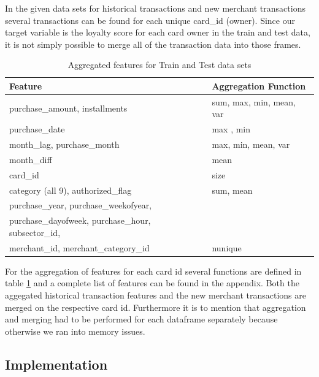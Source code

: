 \documentclass{article}
\begin{document}
In the given data sets for historical transactions and new merchant transactions several transactions can be found for each unique card\_id (owner). Since our target variable is the loyalty score for each card owner in the train and test data, it is not simply possible to merge all of the transaction data into those frames.

\newpage

\begin{table}[h]
 \caption{Aggregated features for Train and Test data sets}
  \centering
  \begin{tabular}{ll}
    \toprule
    Feature & Aggregation Function\\
    \midrule
    purchase\_amount, installments & sum, max, min, mean, var\\
    purchase\_date & max , min\\
    month\_lag, purchase\_month & max, min, mean, var\\
    month\_diff & mean\\
    card\_id & size\\
    category (all 9), authorized\_flag & sum, mean\\
    purchase\_year, purchase\_weekofyear, \\
    purchase\_dayofweek,  purchase\_hour,  subsector\_id,\\
    merchant\_id, merchant\_category\_id & nunique \\
    \bottomrule
  \end{tabular}
  \label{tab:table_agg}
\end{table}

For the aggregation of features for each card id several functions are defined in table \ref{tab:table_agg} and a complete list of features can be found in the appendix. Both the aggegated historical transaction features and the new merchant transactions are merged on the respective card id. Furthermore it is to mention that aggregation and merging had to be performed for each dataframe separately because otherwise we ran into memory issues.


\subsection{Implementation}
\end{document}
